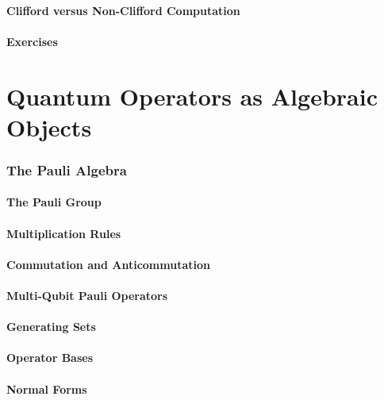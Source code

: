 \documentclass[11pt,a4paper]{article}
\begin{document}
\subsection{Clifford versus Non-Clifford Computation}

\subsection{Exercises}


\part{Quantum Operators as Algebraic Objects}

\section{The Pauli Algebra}

\subsection{The Pauli Group}

\subsection{Multiplication Rules}

\subsection{Commutation and Anticommutation}

\subsection{Multi-Qubit Pauli Operators}

\subsection{Generating Sets}

\subsection{Operator Bases}

\subsection{Normal Forms}
\end{document}
